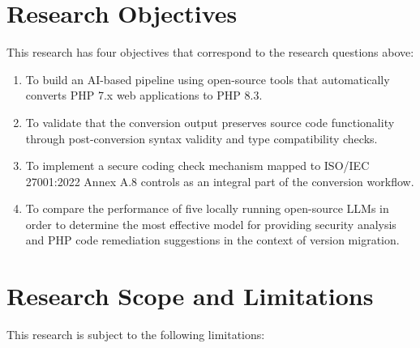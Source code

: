 \section{Research Objectives}
\label{sec:tujuan-penelitian}

This research has four objectives that correspond to the research questions above:

\begin{enumerate}
    \item To build an AI-based pipeline using open-source tools that automatically converts PHP 7.x web applications to PHP 8.3.
    \item To validate that the conversion output preserves source code functionality through post-conversion syntax validity and type compatibility checks.
    \item To implement a secure coding check mechanism mapped to ISO/IEC 27001:2022 Annex A.8 controls as an integral part of the conversion workflow.
    \item To compare the performance of five locally running open-source LLMs in order to determine the most effective model for providing security analysis and PHP code remediation suggestions in the context of version migration.
\end{enumerate}

\section{Research Scope and Limitations}

This research is subject to the following limitations:


